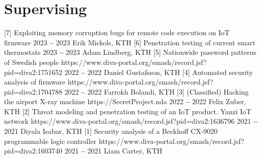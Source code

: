 

\section{Supervising}

  

        \titleLinkYearRolePlace
            {[7] Exploiting memory corruption bugs for remote code execution on IoT firmware}
            {}
            {2023 \textbf{--} 2023}
            {Erik Mickols, KTH}
            {}
        \titleLinkYearRolePlace
            {[6] Penetration testing of current smart thermostats}
            {}
            {2023 \textbf{--} 2023}
            {Adam Lindberg, KTH}
            {}
        \titleLinkYearRolePlace
            {[5] Nationwide password patterns of Swedish people}
            {https://www.diva-portal.org/smash/record.jsf?pid=diva2:1751652}
            {2022 \textbf{--} 2022}
            {Daniel Gustafsson, KTH}
            {}
        \titleLinkYearRolePlace
            {[4] Automated security analysis of firmware}
            {https://www.diva-portal.org/smash/record.jsf?pid=diva2:1704788}
            {2022 \textbf{--} 2022}
            {Farrokh Bolandi, KTH}
            {}
        \titleLinkYearRolePlace
            {[3] (Classified) Hacking the airport X-ray machine}
            {https://SecretProject.nda}
            {2022 \textbf{--} 2022}
            {Felix Zuber, KTH}
            {}
        \titleLinkYearRolePlace
            {[2] Threat modeling and penetration testing of an IoT product. Yanzi IoT network}
            {https://www.diva-portal.org/smash/record.jsf?pid=diva2:1636796}
            {2021 \textbf{--} 2021}
            {Diyala Isabar, KTH}
            {}
        \titleLinkYearRolePlace
            {[1] Security analysis of a Beckhoff CX-9020 programmable logic controller}
            {https://www.diva-portal.org/smash/record.jsf?pid=diva2:1603740}
            {2021 \textbf{--} 2021} 
            {Liam Carter, KTH}
            {}
    
    \itemizeCVEnd


        

